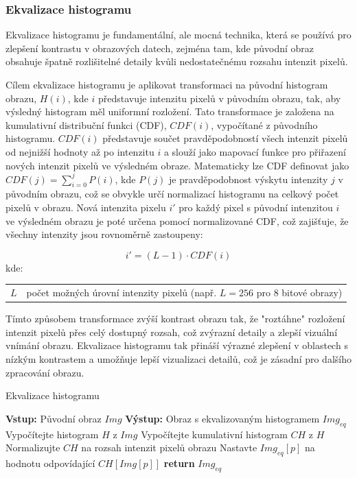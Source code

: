 \documentclass[male,czech,api_ing]{thesis}
\makeatletter
\newenvironment{conditions}[1][kde:]
    {#1 \begin{tabular}[t]{>{$}l<{$} @{${}={}$} >{\raggedright\arraybackslash}p{10cm}}}
    {\end{tabular}}
\makeatother
\begin{document}
\subsubsection{Ekvalizace histogramu}
Ekvalizace histogramu je fundamentální, ale mocná technika, která se používá pro zlepšení kontrastu v obrazových datech, zejména tam, kde původní obraz obsahuje špatně rozlišitelné detaily kvůli nedostatečnému rozsahu intenzit pixelů.

Cílem ekvalizace histogramu je aplikovat transformaci na původní histogram obrazu, $H(i)$, kde $i$ představuje intenzitu pixelů v původním obrazu, tak, aby výsledný histogram měl uniformní rozložení. Tato transformace je založena na kumulativní distribuční funkci (CDF), $CDF(i)$, vypočítané z původního histogramu. $CDF(i)$ představuje součet pravděpodobností všech intenzit pixelů od nejnižší hodnoty až po intenzitu $i$ a slouží jako mapovací funkce pro přiřazení nových intenzit pixelů ve výsledném obraze. Matematicky lze CDF definovat jako $CDF(j) = \sum_{i=0}^{j} P(i)$, kde $P(j)$ je pravděpodobnost výskytu intenzity $j$ v původním obrazu, což se obvykle určí normalizací histogramu na celkový počet pixelů v obrazu. Nová intenzita pixelu $i'$ pro každý pixel s původní intenzitou $i$ ve výsledném obrazu je poté určena pomocí normalizované CDF, což zajišťuje, že všechny intenzity jsou rovnoměrně zastoupeny:

\begin{equation}
    i' = (L-1) \cdot CDF(i)
\end{equation}
\begin{conditions}
    L & počet možných úrovní intenzity pixelů (např. $L = 256$ pro 8 bitové obrazy)
\end{conditions}

Tímto způsobem transformace zvýší kontrast obrazu tak, že "roztáhne" rozložení intenzit pixelů přes celý dostupný rozsah, což zvýrazní detaily a zlepší vizuální vnímání obrazu. Ekvalizace histogramu tak přináší výrazné zlepšení v oblastech s nízkým kontrastem a umožňuje lepší vizualizaci detailů, což je zásadní pro dalšího zpracování obrazu. \cite{ComputerVisionMetrics} \cite{ComputerVisionForX-RayTesting}

\begin{algorithm}
    \caption{Ekvalizace histogramu}
    \begin{algorithmic}[1]
        \State \textbf{Vstup:} Původní obraz $Img$
        \State \textbf{Výstup:} Obraz s ekvalizovaným histogramem $Img_{eq}$
        \State Vypočítejte histogram $H$ z $Img$
        \State Vypočítejte kumulativní histogram $CH$ z $H$
        \State Normalizujte $CH$ na rozsah intenzit pixelů obrazu
            \State Nastavte $Img_{eq}[p]$ na hodnotu odpovídající $CH[Img[p]]$
        \EndFor
        \State \textbf{return} $Img_{eq}$
    \end{algorithmic}
\end{algorithm}
\end{document}
